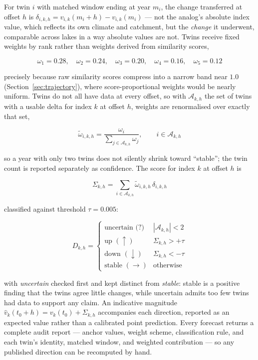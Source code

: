 \documentclass[12pt,a4paper,oneside]{report}
\begin{document}
For twin $i$ with matched window ending at year $m_i$, the change
transferred at offset $h$ is $\delta_{i,k,h} = v_{i,k}(m_i+h) -
v_{i,k}(m_i)$ --- not the analog's absolute index value, which
reflects its own climate and catchment, but the \emph{change} it
underwent, comparable across lakes in a way absolute values are not.
Twins receive fixed weights by rank rather than weights derived from
similarity scores,

\begin{equation}
\omega_1 = 0.28,\quad
\omega_2 = 0.24,\quad
\omega_3 = 0.20,\quad
\omega_4 = 0.16,\quad
\omega_5 = 0.12
\end{equation}

precisely because raw similarity scores compress into a narrow band
near $1.0$ (Section~\ref{sec:trajectory}), where score-proportional
weights would be nearly uniform. Twins do not all have data at every
offset, so with $\mathcal{A}_{k,h}$ the set of twins with a usable
delta for index $k$ at offset $h$, weights are renormalised over
exactly that set,

\begin{equation}
\tilde{\omega}_{i,k,h}
=
\frac{\omega_i}{\sum_{j \in \mathcal{A}_{k,h}} \omega_j},
\qquad i \in \mathcal{A}_{k,h}
\end{equation}

so a year with only two twins does not silently shrink toward
``stable''; the twin count is reported separately as confidence. The
score for index $k$ at offset $h$ is

\begin{equation}
\Sigma_{k,h}
=
\sum_{i \in \mathcal{A}_{k,h}}
\tilde{\omega}_{i,k,h}\,\delta_{i,k,h}
\end{equation}

classified against threshold $\tau=0.005$:

\begin{equation}
D_{k,h} =
\begin{cases}
\text{uncertain (?)} & |\mathcal{A}_{k,h}| < 2\\[4pt]
\text{up } (\uparrow)   & \Sigma_{k,h} > +\tau\\[2pt]
\text{down } (\downarrow) & \Sigma_{k,h} < -\tau\\[2pt]
\text{stable } (\rightarrow) & \text{otherwise}
\end{cases}
\end{equation}

with \emph{uncertain} checked first and kept distinct from
\emph{stable}: stable is a positive finding that the twins agree
little changes, while uncertain admits too few twins had data to
support any claim. An indicative magnitude $\hat{v}_k(t_0+h) =
v_k(t_0) + \Sigma_{k,h}$ accompanies each direction, reported as an
expected value rather than a calibrated point prediction. Every
forecast returns a complete audit report --- anchor values, weight
scheme, classification rule, and each twin's identity, matched
window, and weighted contribution --- so any published direction can
be recomputed by hand.
\end{document}

